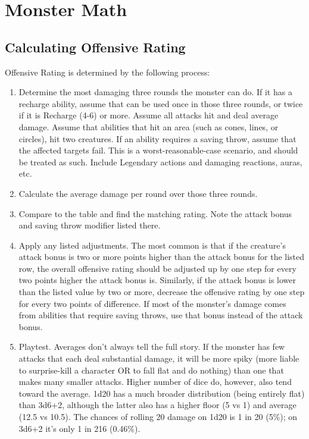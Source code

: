 \section{Monster Math}
\subsection{Calculating Offensive Rating}
Offensive Rating is determined by the following process:
\begin{enumerate}
	\item Determine the most damaging three rounds the monster can do. If it has a recharge ability, assume that can be used once in those three rounds, or twice if it is Recharge (4-6) or more. Assume all attacks hit and deal average damage. Assume that abilities that hit an area (such as cones, lines, or circles), hit two creatures. If an ability requires a saving throw, assume that the affected targets fail. This is a worst-reasonable-case scenario, and should be treated as such. Include Legendary actions and damaging reactions, auras, etc.
	\item Calculate the average damage per round over those three rounds.
	\item Compare to the  table and find the matching rating. Note the attack bonus and saving throw modifier listed there.
	\item Apply any listed adjustments. The most common is that if the creature's attack bonus is two or more points higher than the attack bonus for the listed row, the overall offensive rating should be adjusted up by one step for every two points higher the attack bonus is. Similarly, if the attack bonus is lower than the listed value by two or more, decrease the offensive rating by one step for every two points of difference. If most of the monster's damage comes from abilities that require saving throws, use that bonus instead of the attack bonus.
	\item Playtest. Averages don't always tell the full story. If the monster has few attacks that each deal substantial damage, it will be more spiky (more liable to surprise-kill a character OR to fall flat and do nothing) than one that makes many smaller attacks. Higher number of dice do, however, also tend toward the average. 1d20 has a much broader distribution (being entirely flat) than 3d6+2, although the latter also has a higher floor (5 vs 1) and average (12.5 vs 10.5). The chances of rolling 20 damage on 1d20 is 1 in 20 (5\%); on 3d6+2 it's only 1 in 216 (0.46\%).
\end{enumerate}

